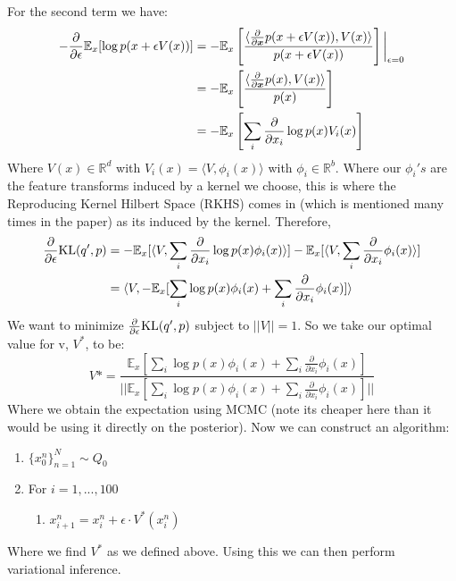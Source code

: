 For the second term we have:
\begin{align}
    - \frac{\partial}{\partial \epsilon} \mathbb{E}_{x}[\log p(x + \epsilon V(x))] 
    &{}= - \mathbb{E}_{x}\left[\frac{\langle \frac{\partial}{\partial \bm{x}} p(x + \epsilon V(x)), V(x) \rangle}{p(x+ \epsilon V(x))} \right] \bigg\rvert_{\epsilon=0} \\
    &= - \mathbb{E}_{x} \left[\frac{\langle \frac{\partial}{\partial \bm{x}} p(x), V(x) \rangle}{p(x)} \right] \\
    &= - \mathbb{E}_{x} \left[\sum_{i} \frac{\partial}{\partial x_{i}} \log p(x) V_{i}(x) \right]
\end{align}
Where $V(x) \in \mathbb{R}^{d}$ with $V_{i}(x) = \langle V, \phi_{i}(x) \rangle$ with $\phi_{i} \in \mathbb{R}^{b}$. Where our $\phi_{i}'s$ are the feature transforms induced by a kernel we choose, this is where the Reproducing Kernel Hilbert Space (RKHS) comes in (which is mentioned many times in the paper) as its induced by the kernel. Therefore,
\begin{align}
    \frac{\partial}{\partial \epsilon} \text{KL}(q',p) &{}= - \mathbb{E}_{x}[\langle V, \sum_{i} \frac{\partial}{\partial x_{i}} \log p(x) \phi_{i}(x) \rangle ] - \mathbb{E}_{x}[\langle V, \sum_{i} \frac{\partial}{\partial x_{i}} \phi_{i}(x) \rangle ] \\ 
    &= \langle V, -\mathbb{E}_{x}[\sum_{i} \log p(x) \phi_{i}(x) + \sum_{i} \frac{\partial}{\partial x_{i}} \phi_{i}(x) ] \rangle
\end{align}
We want to minimize $\frac{\partial}{\partial \epsilon} \text{KL}(q',p)$ subject to $||V||=1$. So we take our optimal value for v, $V^{*}$, to be:
\begin{equation}
    V* = \frac{\mathbb{E}_{x}[ \sum_{i} \log p(x) \phi_{i}(x) + \sum_{i} \frac{\partial}{\partial x_{i}} \phi_{i}(x) ]}{ || \mathbb{E}_{x}[\sum_{i} \log p(x) \phi_{i}(x) + \sum_{i} \frac{\partial}{\partial x_{i}} \phi_{i}(x)] ||}
\end{equation}
Where we obtain the expectation using MCMC (note its cheaper here than it would be using it directly on the posterior). Now we can construct an algorithm:
\begin{enumerate}
    \item $\{x_{0}^{n}\}_{n=1}^{N} \sim Q_{0} $
    \item For $i = 1,...,100$
    \begin{enumerate}
        \item $x_{i+1}^{n} = x_{i}^{n} + \epsilon \cdot V^{*}(x_{i}^{n})$
    \end{enumerate}
\end{enumerate}
Where we find $V^{*}$ as we defined above. Using this we can then perform variational inference. 